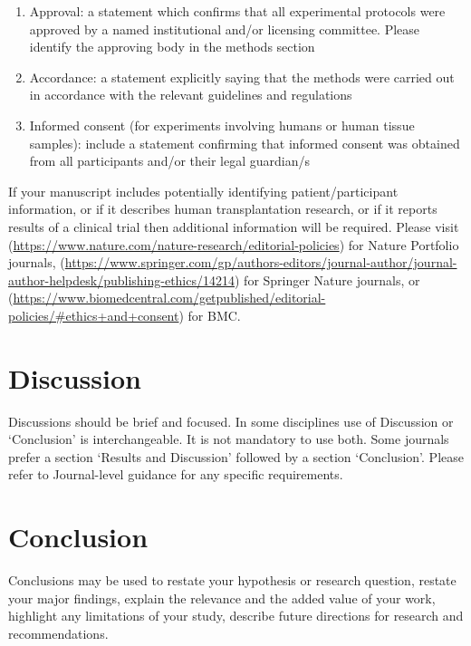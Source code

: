 \documentclass[sn-basic,pdflatex]{sn-jnl}
\theoremstyle{remark}
\theoremstyle{definition}
\begin{document}
\begin{enumerate}
\def\labelenumi{\arabic{enumi}.}
\item
  Approval: a statement which confirms that all experimental protocols
  were approved by a named institutional and/or licensing committee.
  Please identify the approving body in the methods section
\item
  Accordance: a statement explicitly saying that the methods were
  carried out in accordance with the relevant guidelines and regulations
\item
  Informed consent (for experiments involving humans or human tissue
  samples): include a statement confirming that informed consent was
  obtained from all participants and/or their legal guardian/s
\end{enumerate}

If your manuscript includes potentially identifying patient/participant
information, or if it describes human transplantation research, or if it
reports results of a clinical trial then additional information will be
required. Please visit
(\url{https://www.nature.com/nature-research/editorial-policies}) for
Nature Portfolio journals,
(\url{https://www.springer.com/gp/authors-editors/journal-author/journal-author-helpdesk/publishing-ethics/14214})
for Springer Nature journals, or
(\url{https://www.biomedcentral.com/getpublished/editorial-policies/\#ethics+and+consent})
for BMC.

\hypertarget{sec12}{%
\section{Discussion}\label{sec12}}

Discussions should be brief and focused. In some disciplines use of
Discussion or `Conclusion' is interchangeable. It is not mandatory to
use both. Some journals prefer a section `Results and Discussion'
followed by a section `Conclusion'. Please refer to Journal-level
guidance for any specific requirements.

\hypertarget{sec13}{%
\section{Conclusion}\label{sec13}}

Conclusions may be used to restate your hypothesis or research question,
restate your major findings, explain the relevance and the added value
of your work, highlight any limitations of your study, describe future
directions for research and recommendations.
\end{document}
